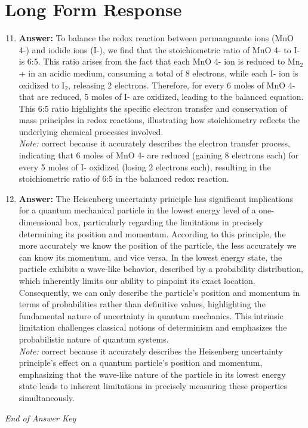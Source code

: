 \documentclass[12pt]{article}
\begin{document}
\section*{Long Form Response}
\begin{enumerate}[label=\arabic*.]
\setcounter{enumi}{10}
\item \textbf{Answer:} To balance the redox reaction between permanganate ions (MnO 4-) and iodide ions (I-), we find that the stoichiometric ratio of MnO 4- to I- is 6:5. This ratio arises from the fact that each MnO 4- ion is reduced to Mn$_{2}$+ in an acidic medium, consuming a total of 8 electrons, while each I- ion is oxidized to I$_{2}$, releasing 2 electrons. Therefore, for every 6 moles of MnO 4- that are reduced, 5 moles of I- are oxidized, leading to the balanced equation. This 6:5 ratio highlights the specific electron transfer and conservation of mass principles in redox reactions, illustrating how stoichiometry reflects the underlying chemical processes involved.
\\ \textit{Note:} correct because it accurately describes the electron transfer process, indicating that 6 moles of MnO 4- are reduced (gaining 8 electrons each) for every 5 moles of I- oxidized (losing 2 electrons each), resulting in the stoichiometric ratio of 6:5 in the balanced redox reaction.
\item \textbf{Answer:} The Heisenberg uncertainty principle has significant implications for a quantum mechanical particle in the lowest energy level of a one-dimensional box, particularly regarding the limitations in precisely determining its position and momentum. According to this principle, the more accurately we know the position of the particle, the less accurately we can know its momentum, and vice versa. In the lowest energy state, the particle exhibits a wave-like behavior, described by a probability distribution, which inherently limits our ability to pinpoint its exact location. Consequently, we can only describe the particle's position and momentum in terms of probabilities rather than definitive values, highlighting the fundamental nature of uncertainty in quantum mechanics. This intrinsic limitation challenges classical notions of determinism and emphasizes the probabilistic nature of quantum systems.
\\ \textit{Note:} correct because it accurately describes the Heisenberg uncertainty principle's effect on a quantum particle's position and momentum, emphasizing that the wave-like nature of the particle in its lowest energy state leads to inherent limitations in precisely measuring these properties simultaneously.
\end{enumerate}

\vfill
\noindent\textit{End of Answer Key}
\end{document}
